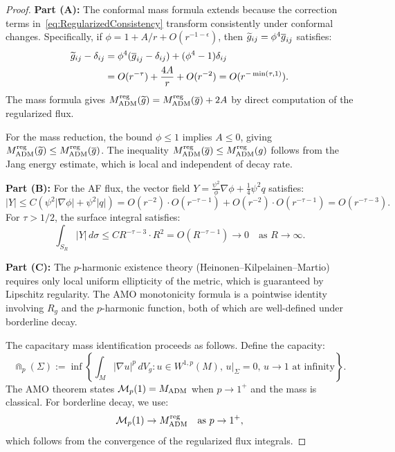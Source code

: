 \begin{proof}
\textbf{Part (A):} The conformal mass formula extends because the correction terms in~\eqref{eq:RegularizedConsistency} transform consistently under conformal changes. Specifically, if $\phi = 1 + A/r + O(r^{-1-\epsilon})$, then $\widetilde{g}_{ij} = \phi^4 \overline{g}_{ij}$ satisfies:
\begin{align}
    \widetilde{g}_{ij} - \delta_{ij} &= \phi^4 (\overline{g}_{ij} - \delta_{ij}) + (\phi^4 - 1)\delta_{ij} \\
    &= O(r^{-\tau}) + \frac{4A}{r} + O(r^{-2}) = O(r^{-\min(\tau, 1)}).
\end{align}
The mass formula gives $M_{\mathrm{ADM}}^{\mathrm{reg}}(\widetilde{g}) = M_{\mathrm{ADM}}^{\mathrm{reg}}(\overline{g}) + 2A$ by direct computation of the regularized flux.

For the mass reduction, the bound $\phi \le 1$ implies $A \le 0$, giving $M_{\mathrm{ADM}}^{\mathrm{reg}}(\widetilde{g}) \le M_{\mathrm{ADM}}^{\mathrm{reg}}(\overline{g})$. The inequality $M_{\mathrm{ADM}}^{\mathrm{reg}}(\overline{g}) \le M_{\mathrm{ADM}}^{\mathrm{reg}}(g)$ follows from the Jang energy estimate, which is local and independent of decay rate.

\textbf{Part (B):} For the AF flux, the vector field $Y = \frac{\psi^2}{\phi} \nabla\phi + \frac{1}{4}\psi^2 q$ satisfies:
\begin{equation}
    |Y| \le C(\psi^2 |\nabla\phi| + \psi^2 |q|) = O(r^{-2}) \cdot O(r^{-\tau-1}) + O(r^{-2}) \cdot O(r^{-\tau-1}) = O(r^{-\tau-3}).
\end{equation}
For $\tau > 1/2$, the surface integral satisfies:
\begin{equation}
    \int_{S_R} |Y| \, d\sigma \le C R^{-\tau-3} \cdot R^2 = O(R^{-\tau-1}) \to 0 \quad \text{as } R \to \infty.
\end{equation}

\textbf{Part (C):} The $p$-harmonic existence theory (Heinonen--Kilpelainen--Martio) requires only local uniform ellipticity of the metric, which is guaranteed by Lipschitz regularity. The AMO monotonicity formula is a pointwise identity involving $R_g$ and the $p$-harmonic function, both of which are well-defined under borderline decay.

The capacitary mass identification proceeds as follows. Define the capacity:
\begin{equation}
    \Cap_p(\Sigma) := \inf \left\{ \int_M |\nabla u|^p \, dV_g : u \in W^{1,p}(M), \, u|_\Sigma = 0, \, u \to 1 \text{ at infinity} \right\}.
\end{equation}
The AMO theorem states $\mathcal{M}_p(1) = M_{\mathrm{ADM}}$ when $p \to 1^+$ and the mass is classical. For borderline decay, we use:
\begin{equation}
    \mathcal{M}_p(1) \to M_{\mathrm{ADM}}^{\mathrm{reg}} \quad \text{as } p \to 1^+,
\end{equation}
which follows from the convergence of the regularized flux integrals.


\end{proof}

